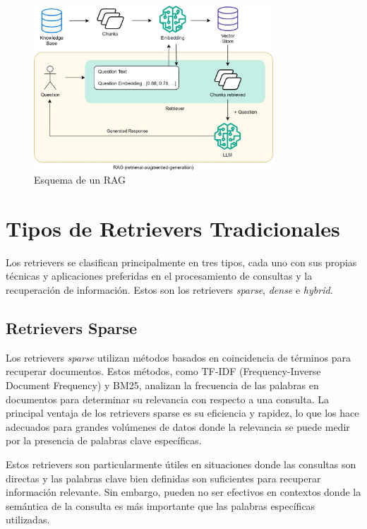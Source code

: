 \begin{figure}[h]
\centering
\includegraphics[width=0.8\textwidth]{figuras/capitulo5/retriever.jpg}
\caption{Esquema de un RAG}
\label{fig:retriever}
\end{figure}

\section{Tipos de Retrievers Tradicionales}

Los retrievers se clasifican principalmente en tres tipos, cada uno con sus propias técnicas y aplicaciones preferidas en el procesamiento de consultas y la recuperación de información. Estos son los retrievers \textit{sparse}, \textit{dense} e \textit{hybrid}.

\subsection{Retrievers Sparse}

Los retrievers \textit{sparse} utilizan métodos basados en coincidencia de términos para recuperar documentos. Estos métodos, como TF-IDF (Frequency-Inverse Document Frequency) y BM25, analizan la frecuencia de las palabras en documentos para determinar su relevancia con respecto a una consulta. La principal ventaja de los retrievers sparse es su eficiencia y rapidez, lo que los hace adecuados para grandes volúmenes de datos donde la relevancia se puede medir por la presencia de palabras clave específicas. \citep{lewis2020retrieval}

Estos retrievers son particularmente útiles en situaciones donde las consultas son directas y las palabras clave bien definidas son suficientes para recuperar información relevante. Sin embargo, pueden no ser efectivos en contextos donde la semántica de la consulta es más importante que las palabras específicas utilizadas.

